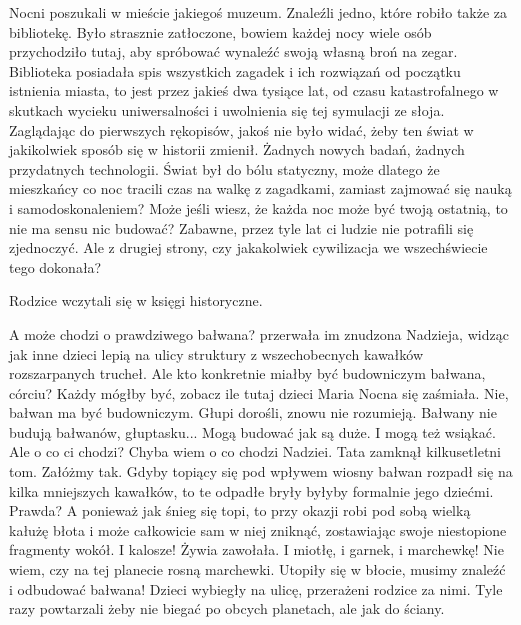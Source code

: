 Nocni poszukali w mieście jakiegoś muzeum.
Znaleźli jedno, które robiło także za bibliotekę.
Było strasznie zatłoczone, bowiem każdej nocy wiele osób przychodziło tutaj, aby spróbować wynaleźć swoją własną broń na zegar.
Biblioteka posiadała spis wszystkich zagadek i ich rozwiązań od początku istnienia miasta, to jest przez jakieś dwa tysiące lat, od czasu katastrofalnego w skutkach wycieku uniwersalności i uwolnienia się tej symulacji ze słoja.
Zaglądając do pierwszych rękopisów, jakoś nie było widać, żeby ten świat w jakikolwiek sposób się w historii zmienił. 
Żadnych nowych badań, żadnych przydatnych technologii.
Świat był do bólu statyczny, może dlatego że mieszkańcy co noc tracili czas na walkę z zagadkami, zamiast zajmować się nauką i samodoskonaleniem?
Może jeśli wiesz, że każda noc może być twoją ostatnią, to nie ma sensu nic budować?
Zabawne, przez tyle lat ci ludzie nie potrafili się zjednoczyć.
Ale z drugiej strony, czy jakakolwiek cywilizacja we wszechświecie tego dokonała?

Rodzice wczytali się w księgi historyczne.
\begin{dialogue}
	\ds{} A może chodzi o prawdziwego bałwana? \dm{} przerwała im znudzona Nadzieja, widząc jak inne dzieci lepią na ulicy struktury z wszechobecnych kawałków rozszarpanych trucheł.
	\ds{} Ale kto konkretnie miałby być budowniczym bałwana, córciu? Każdy mógłby być, zobacz ile tutaj dzieci \dm{} Maria Nocna się zaśmiała.
	\ds{} Nie, bałwan ma być budowniczym.
		\dm{} Głupi dorośli, znowu nie rozumieją.
	\ds{} Bałwany nie budują bałwanów, głuptasku...
	\ds{} Mogą budować jak są duże. I mogą też wsiąkać.
	\ds{} Ale o co ci chodzi?
	\ds{} Chyba wiem o co chodzi Nadziei. 
		\dm{} Tata zamknął kilkusetletni tom. 
		\dm{} Załóżmy tak. Gdyby topiący się pod wpływem wiosny bałwan rozpadł się na kilka mniejszych kawałków, to te odpadłe bryły byłyby formalnie jego dziećmi. Prawda? A ponieważ jak śnieg się topi, to przy okazji robi pod sobą wielką kałużę błota i może całkowicie sam w niej zniknąć, zostawiając swoje niestopione fragmenty wokół.
	\ds{} I kalosze! \dm{} Żywia zawołała. \dm{} I miotłę, i garnek, i marchewkę!
	\ds{} Nie wiem, czy na tej planecie rosną marchewki.
	\ds{} Utopiły się w błocie, musimy znaleźć i odbudować bałwana! \dm{} Dzieci wybiegły na ulicę, przerażeni rodzice za nimi. Tyle razy powtarzali żeby nie biegać po obcych planetach, ale jak do ściany.
\end{dialogue}

